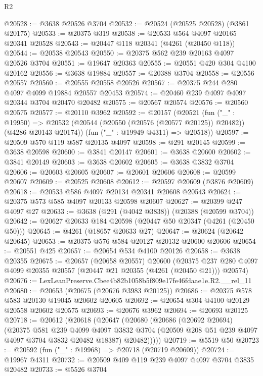 \begin{lexlean}{R2}
\begin{coremodule}
@20528 := @3638 @20526 @3704
@20532 := @20524 (@20525 @20528) (@3861 @20175)
@20533 := @20375 @319
@20538 := @20533 @564 @4097 @20165 @20341 @20528
@20543 := @20447 @118 @20341 (@4261 (@20450 @118))
@20544 := @20538 @20543
@20550 := @20375 @562 @239 @20163 @4097 @20526 @3704
@20551 := @19647 @20363
@20555 := @20551 @420 @304 @4100 @20162
@20556 := @3638 @19884
@20557 := @20388 @3704
@20558 := @20556 @20557
@20560 := @20555 @20558 @20526
@20567 := @20375 @244 @280 @4097 @4099 @19884 @20557 @20453
@20574 := @20460 @239 @4097 @4097 @20344 @3704 @20470 @20482
@20575 := @20567 @20574
@20576 := @20560 @20575
@20577 := @20110 @3962
@20592 := @20157
    (@20521
      (fun ("_" : @19950) =>
      @20532 (@20544 (@20550 (@20576 (@20577 @20125)) @20482)) (@4286 @20143 @20174))
      (fun ("_" : @19949 @4311) => @20518))
@20597 := @20509 @570 @119 @587 @20135 @4097
@20598 := @291 @20145
@20599 := @3638 @20598
@20600 := @3841 @20147
@20601 := @3638 @20600
@20602 := @3841 @20149
@20603 := @3638 @20602
@20605 := @3638 @3832 @3704
@20606 := @20603 @20605
@20607 := @20601 @20606
@20608 := @20599 @20607
@20609 := @20525 @20608
@20612 := @20597 @20609 (@3876 @20609)
@20618 := @20533 @586 @4097 @20134 @20341 @20608 @20543
@20624 := @20375 @573 @585 @4097 @20133 @20598 @20607
@20627 := @20399 @247 @4097 @27
@20633 := @3638 (@291 (@4042 @3838)) (@20388 (@20599 @3704))
@20642 := @20627 @20633 @184 @20598 (@20447 @50 @20347 (@4261 (@20450 @50)))
@20645 := @4261 (@18657 @20633 @27)
@20647 := @20624 (@20642 @20645)
@20653 := @20375 @576 @584 @20127 @20132 @20600 @20606
@20654 := @20551 @425
@20657 := @20654 @534 @4100 @20126
@20658 := @3638 @20355
@20675 := @20657
    (@20658 @20557)
    @20600
    (@20375 @237 @280 @4097 @4099 @20355 @20557 (@20447 @21 @20355 (@4261 (@20450 @21))) @20574)
@20676 := LexLeanPreserve.Cbee4b82b1058b5f809e17fe46fdaae1e.R2.__rel_11
@20680 := @20653 (@20675 (@20676 @3983 @20125))
@20686 := @20375 @578 @583 @20130 @19045 @20602 @20605
@20692 := @20654 @304 @4100 @20129 @20558 @20602 @20575
@20693 := @20676 @3962
@20694 := @20693 @20125
@20718 := @20612
    (@20618
      (@20647
        (@20680
          (@20686
            (@20692 @20694)
            (@20375
              @581
              @239
              @4099
              @4097
              @3832
              @3704
              (@20509 @208 @51 @239 @4097 @4097 @3704 @3832 @20482 @18387)
              @20482)))))
@20719 := @5519 @50
@20723 := @20592 (fun ("_" : @19968) => @20718 (@20719 @20609))
@20724 := @19967 @4311
@20732 := @20509 @409 @119 @239 @4097 @4097 @3704 @3835 @20482
@20733 := @5526 @3704

\end{coremodule}
\end{lexlean}
